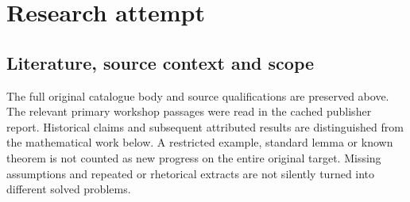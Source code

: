 \documentclass[11pt]{article}
\begin{document}
\section{Research attempt}
\subsection{Literature, source context and scope}
The full original catalogue body and source qualifications are preserved above. The relevant primary workshop passages were read in the cached publisher report. Historical claims and subsequent attributed results are distinguished from the mathematical work below. A restricted example, standard lemma or known theorem is not counted as new progress on the entire original target. Missing assumptions and repeated or rhetorical extracts are not silently turned into different solved problems.
\end{document}
